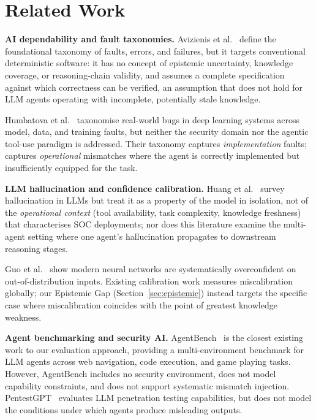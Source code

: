 \section{Related Work}
\label{sec:related}

\textbf{AI dependability and fault taxonomies.}
Avizienis et al.~\cite{avizienis2004} define the foundational taxonomy of
faults, errors, and failures, but it targets conventional deterministic
software: it has no concept of epistemic uncertainty, knowledge coverage,
or reasoning-chain validity, and assumes a complete specification against
which correctness can be verified, an assumption that does not hold for
LLM agents operating with incomplete, potentially stale knowledge.

Humbatova et al.~\cite{humbatova2020} taxonomise real-world bugs in deep
learning systems across model, data, and training faults, but neither the
security domain nor the agentic tool-use paradigm is addressed. Their
taxonomy captures \textit{implementation} faults; \ARES{} captures
\textit{operational} mismatches where the agent is correctly implemented
but insufficiently equipped for the task.

\textbf{LLM hallucination and confidence calibration.}
Huang et al.~\cite{huang2023hallucination} survey hallucination in LLMs but
treat it as a property of the model in isolation, not of the
\textit{operational context} (tool availability, task complexity, knowledge
freshness) that characterises SOC deployments; nor does this literature
examine the multi-agent setting where one agent's hallucination propagates
to downstream reasoning stages.

Guo et al.~\cite{guo2017calibration} show modern neural networks are
systematically overconfident on out-of-distribution inputs. Existing
calibration work measures miscalibration globally; our Epistemic Gap
(Section~\ref{sec:epistemic}) instead targets the specific case where
miscalibration coincides with the point of greatest knowledge weakness.

\textbf{Agent benchmarking and security AI.}
AgentBench~\cite{liu2023agentbench} is the closest existing work to our
evaluation approach, providing a multi-environment benchmark for LLM agents
across web navigation, code execution, and game playing tasks. However,
AgentBench includes no security environment, does not model capability
constraints, and does not support systematic mismatch injection.
PentestGPT~\cite{deng2023pentest} evaluates LLM penetration testing
capabilities, but does not model the conditions under which agents
produce misleading outputs.

